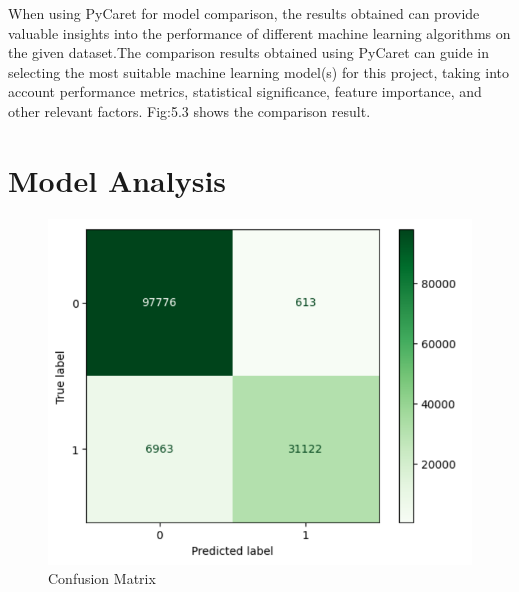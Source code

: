 \par When using PyCaret for model comparison, the results obtained can provide valuable insights into the performance of different machine learning algorithms on the given dataset.The comparison results obtained using PyCaret can guide in selecting the most suitable machine learning model(s) for this project, taking into account performance metrics, statistical significance, feature importance, and other relevant factors. Fig:5.3 shows the comparison result.
\section{Model Analysis}
\begin{figure}[H]
\centerline{\includegraphics[scale=0.6]{greenCN.png}}
\caption{Confusion Matrix}
\label{fig}
\end{figure}


